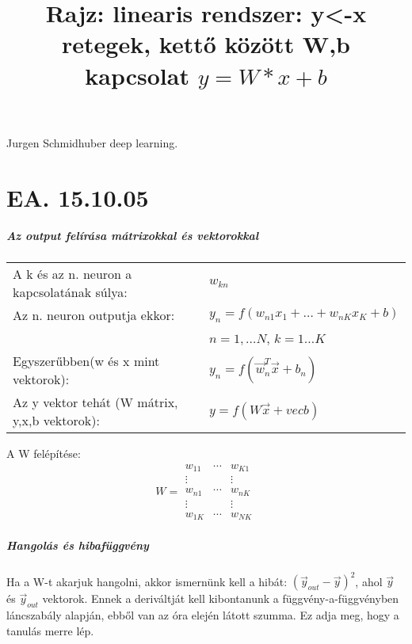 \documentclass[10pt,a4paper]{report}
\begin{document}
\paragraph{}
Jurgen Schmidhuber deep learning.

\chapter{EA. 15.10.05}
\paragraph{Az output felírása mátrixokkal és vektorokkal}
\begin{tabular}{ll}
A k és az n. neuron a kapcsolatának súlya: &$ w_{kn} $\\
Az n. neuron outputja ekkor: &$y_n=f(w_{n1}x_1+\dots + w_{nK}x_K+b)$ \\ &$n=1,\dots N$, $k=1\dots K$\\
Egyszerűbben(w és x mint vektorok): &$y_n = f(\vec{w}_n^T\vec{x}+b_n)$\\
Az y vektor tehát (W mátrix, y,x,b vektorok): &$y = f(W\vec{x} + vec{b}) $\\
\end{tabular}

A W felépítése: 
\begin{equation}
W = \begin{matrix}
w_{1 1}&\cdots &w_{K 1}\\
\vdots & &\vdots \\ 
w_{n1} &\cdots& w_{nK} \\
\vdots & &\vdots \\ 
w_{1K} &\cdots &w_{NK}
\end{matrix}
\end{equation}
\paragraph{Hangolás és hibafüggvény}
Ha a W-t akarjuk hangolni, akkor ismernünk kell a hibát: $(\vec{y}_{out} - \vec{y})^2$, ahol $\vec{y}$ és $\vec{y}_{out}$ vektorok. Ennek a deriváltját kell kibontanunk a függvény-a-függvényben láncszabály alapján, ebből van az óra elején látott szumma. Ez adja meg, hogy a tanulás merre lép. 
\begin{figure}[h]
\title{Rajz: linearis rendszer: y<-x retegek, kettő között W,b kapcsolat $y=W*x+b$}
\end{figure}
\end{document}
